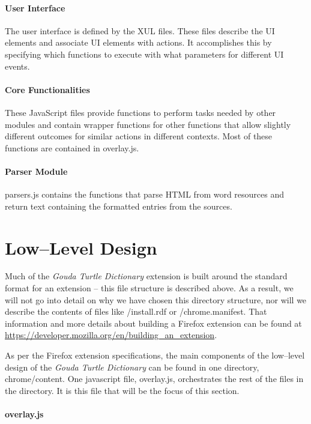 \documentclass{article}
\begin{document}
\paragraph{User Interface}
The user interface is defined by the XUL files. These files describe the
UI elements and associate UI elements with actions. It accomplishes this
by specifying which functions to execute with what parameters for different
UI events.

\paragraph{Core Functionalities}
These JavaScript files provide functions to perform tasks needed by other
modules and contain wrapper functions for other functions that allow
slightly different outcomes for similar actions in different contexts.
Most of these functions are contained in overlay.js.

\paragraph{Parser Module}
parsers.js contains the functions that parse HTML from word resources and return
text containing the formatted entries from the sources.

\section{Low--Level Design}

Much of the \emph{Gouda Turtle Dictionary} extension is built around the standard
format for an extension -- this file structure is described above. As a result,
we will not go into detail on why we have chosen this directory structure, nor
will we describe the contents of files like /install.rdf or /chrome.manifest.
That information and more details about building a Firefox extension can be
found at \url{https://developer.mozilla.org/en/building_an_extension}.

As per the Firefox extension specifications, the main components of the
low--level design of the \emph{Gouda Turtle Dictionary} can be found in
one directory, chrome/content. One javascript file, overlay.js, orchestrates the
rest of the files in the directory. It is this file that will be the focus of
this section.

\paragraph{overlay.js}
\end{document}
